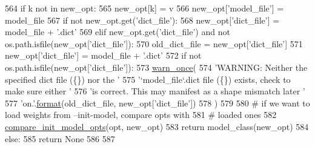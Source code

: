\begin{DoxyCode}
564             \textcolor{keywordflow}{if} k \textcolor{keywordflow}{not} \textcolor{keywordflow}{in} new\_opt:
565                 new\_opt[k] = v
566         new\_opt[\textcolor{stringliteral}{'model\_file'}] = model\_file
567         \textcolor{keywordflow}{if} \textcolor{keywordflow}{not} new\_opt.get(\textcolor{stringliteral}{'dict\_file'}):
568             new\_opt[\textcolor{stringliteral}{'dict\_file'}] = model\_file + \textcolor{stringliteral}{'.dict'}
569         \textcolor{keywordflow}{elif} new\_opt.get(\textcolor{stringliteral}{'dict\_file'}) \textcolor{keywordflow}{and} \textcolor{keywordflow}{not} os.path.isfile(new\_opt[\textcolor{stringliteral}{'dict\_file'}]):
570             old\_dict\_file = new\_opt[\textcolor{stringliteral}{'dict\_file'}]
571             new\_opt[\textcolor{stringliteral}{'dict\_file'}] = model\_file + \textcolor{stringliteral}{'.dict'}
572         \textcolor{keywordflow}{if} \textcolor{keywordflow}{not} os.path.isfile(new\_opt[\textcolor{stringliteral}{'dict\_file'}]):
573             \hyperlink{namespaceparlai_1_1utils_1_1misc_a884a3aefa90581f53bc592fa6a78dc43}{warn\_once}(
574                 \textcolor{stringliteral}{'WARNING: Neither the specified dict file (\{\}) nor the '}
575                 \textcolor{stringliteral}{'`model\_file`.dict file (\{\}) exists, check to make sure either '}
576                 \textcolor{stringliteral}{'is correct. This may manifest as a shape mismatch later '}
577                 \textcolor{stringliteral}{'on.'}.\hyperlink{namespaceparlai_1_1chat__service_1_1services_1_1messenger_1_1shared__utils_a32e2e2022b824fbaf80c747160b52a76}{format}(old\_dict\_file, new\_opt[\textcolor{stringliteral}{'dict\_file'}])
578             )
579 
580         \textcolor{comment}{# if we want to load weights from --init-model, compare opts with}
581         \textcolor{comment}{# loaded ones}
582         \hyperlink{namespaceparlai_1_1core_1_1agents_a9761bb2314603dd92f5eee786930b21a}{compare\_init\_model\_opts}(opt, new\_opt)
583         \textcolor{keywordflow}{return} model\_class(new\_opt)
584     \textcolor{keywordflow}{else}:
585         \textcolor{keywordflow}{return} \textcolor{keywordtype}{None}
586 
587 
\end{DoxyCode}
\mbox{\label{namespaceparlai_1_1core_1_1agents_aa5af5dd1d2f9da491b60348d479b849f}} 
